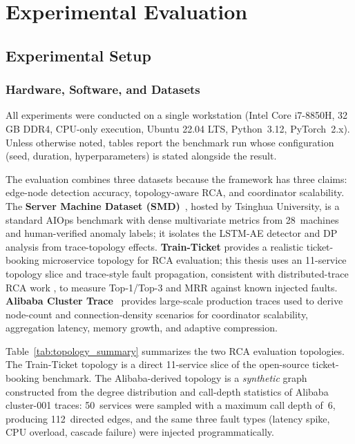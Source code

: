 \chapter{Experimental Evaluation}
\label{ch:evaluation}

\section{Experimental Setup}
\label{sec:eval_setup}

\subsection{Hardware, Software, and Datasets}
\label{subsec:eval_hardware}

All experiments were conducted on a single workstation (Intel Core i7-8850H,
32\,GB DDR4, CPU-only execution, Ubuntu 22.04 LTS, Python~3.12, PyTorch~2.x).
Unless otherwise noted, tables report the benchmark run whose configuration
(seed, duration, hyperparameters) is stated alongside the result.

The evaluation combines three datasets because the framework has three claims:
edge-node detection accuracy, topology-aware RCA, and coordinator scalability.
The \textbf{Server Machine Dataset (SMD)}~\cite{su2019robust}, hosted by
Tsinghua University, is a standard AIOps benchmark with dense multivariate
metrics from 28~machines and human-verified anomaly labels; it isolates the
LSTM-AE detector and DP analysis from trace-topology effects.
\textbf{Train-Ticket} provides a realistic ticket-booking microservice topology
for RCA evaluation; this thesis uses an 11-service topology slice and
trace-style fault propagation, consistent with distributed-trace RCA work
\cite{zhang2019rootcause, zhang2019tracing}, to measure Top-1/Top-3 and MRR
against known injected faults. \textbf{Alibaba Cluster Trace}~\cite{alibaba2022cluster} provides large-scale production traces used to
derive node-count and connection-density scenarios for coordinator scalability,
aggregation latency, memory growth, and adaptive compression.

Table~\ref{tab:topology_summary} summarizes the two RCA evaluation topologies.
The Train-Ticket topology is a direct 11-service slice of the open-source
ticket-booking benchmark. The Alibaba-derived topology is a \emph{synthetic}
graph constructed from the degree distribution and call-depth statistics of
Alibaba cluster-001 traces: 50~services were sampled with a maximum call depth
of~6, producing 112~directed edges, and the same three fault types (latency
spike, CPU overload, cascade failure) were injected programmatically.

